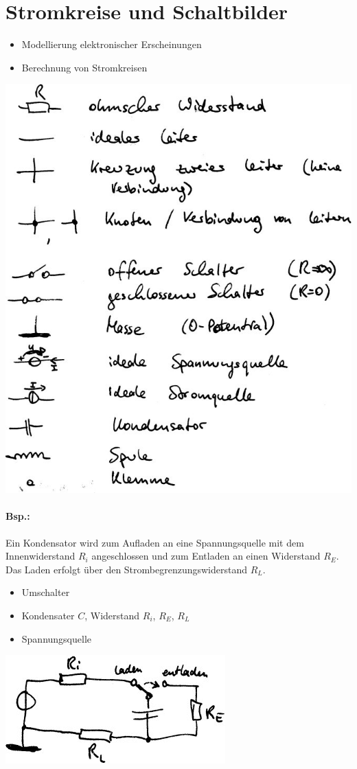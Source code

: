 \section{Stromkreise und Schaltbilder}
\begin{itemize}
\item Modellierung elektronischer Erscheinungen
\item Berechnung von Stromkreisen
\end{itemize}
\includegraphics[scale=.5]{Abbildungen/ABB207}

\paragraph{Bsp.:} Ein Kondensator wird zum Aufladen an eine Spannungsquelle mit dem Innenwiderstand $R_i$ angeschlossen und zum Entladen an einen Widerstand $R_E$. Das Laden erfolgt über den Strombegrenzungswiderstand $R_L$.
\begin{itemize}
\item Umschalter
\item Kondensater $C$, Widerstand $R_i$, $R_E$, $R_L$
\item Spannungsquelle
\end{itemize}
\includegraphics[scale=.75]{Abbildungen/ABB208}

